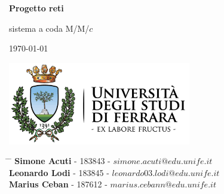 \documentclass[12pt,a4paper]{article}
\begin{document}
	
	\newcommand{\subf}[2]{%
		{\small\begin{tabular}[t]{@{}c@{}}
				#1\\#2
		\end{tabular}}%
	}
	
	\begin{titlepage}
		\begin{center}
			\vspace*{3cm}
			
			\Huge
			\textbf{Progetto reti}
			
			\vspace{0.3cm}
			\Huge
			 sistema a coda M/M/$c$
			
			\vspace{0.8cm}
			\large
			\today
			
			
			\vspace{0.5cm}
			\LARGE
			
			
			\vspace{3cm}
			
			\textbf{}
            \includegraphics[width=0.6\textwidth]{logo-unife.png}
			
			\vfill
			
			
			
			\vspace{2.8cm}
			
			
			
			\Large
			
			
			
			
		\end{center}
		\Large
		\begin{tabbing}
			\hspace*{0em}\= \hspace*{0em} \= \kill %
			\>\> \textbf{Simone Acuti} - 183843 - $simone.acuti@edu.unife.it$\\
			\>\> \textbf{Leonardo Lodi} - 183845 - $leonardo03.lodi@edu.unife.it$\\
			\>\> \textbf{Marius Ceban} - 187612 - $marius.cebann@edu.unife.it$  \\
		\end{tabbing}
		
\end{titlepage}
\tableofcontents
\newpage
\end{document}
